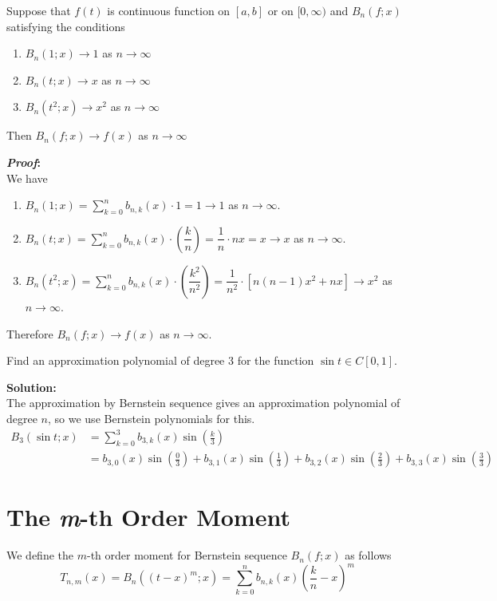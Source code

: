 \begin{theorem}
	Suppose that \(f(t)\) is continuous function on \([a,b]\) or on \([0, \infty)\) and \(B_n(f;x)\) satisfying the conditions
	\begin{enumerate}
		\item \(B_n(1;x) \to 1\) as \(n \to \infty\)
		\item \(B_n(t;x) \to x\) as \(n \to \infty\)
		\item \(B_n(t^2;x) \to x^2\) as \(n \to \infty\)
	\end{enumerate}
	Then \(B_n(f;x) \to f(x)\) as \(n \to \infty\)
\end{theorem}
\noindent
\textbf{\textit{Proof}:}\\
\noindent
We have
\begin{enumerate}
	\item \(B_n(1;x) = \sum_{k=0}^{n} b_{n,k}(x)\cdot1 = 1 \to 1\) as \(n\to \infty\).
	\item \(B_n(t;x) = \sum_{k=0}^{n} b_{n,k}(x) \cdot \left(\dfrac{k}{n}\right)= \dfrac{1}{n}\cdot nx = x \to x\) as \(n \to \infty\). 
	\item \(B_n(t^2;x) = \sum_{k=0}^{n} b_{n,k}(x) \cdot \left(\dfrac{k^2}{n^2}\right)= \dfrac{1}{n^2}\cdot[n(n-1)x^2+nx] \to x^2\) as \(n \to \infty\).
\end{enumerate}
Therefore \(B_n(f;x) \to f(x)\) as \(n\to \infty\). \qedsymbol


\newpage
\begin{example}
	Find an approximation polynomial of degree 3 for the function \(\sin t \in C[0,1]\). 
\end{example}
\noindent
\textbf{Solution:}\\
\noindent
The approximation by Bernstein sequence gives an approximation polynomial of degree \(n\), so we use Bernstein polynomials for this.
\begin{align*}
	B_3(\sin t; x) &= \sum_{k=0}^{3} b_{3,k}(x) \sin\left(\frac{k}{3}\right)\\
	&= b_{3,0}(x) \sin\left(\frac{0}{3}\right) + b_{3,1}(x) \sin\left(\frac{1}{3}\right) + b_{3,2}(x) \sin\left(\frac{2}{3}\right) + b_{3,3}(x) \sin\left(\frac{3}{3}\right)
\end{align*}
\section{The \textit{m}-th Order Moment}
\begin{definition}
		We define the \(m\)-th order moment for Bernstein sequence \(B_n(f;x)\) as follows
	\[
	T_{n,m}(x) = B_n((t-x)^m;x) = \sum_{k=0}^{n}b_{n,k}(x) \left(\frac{k}{n}-x\right)^m
	\]
\end{definition}

